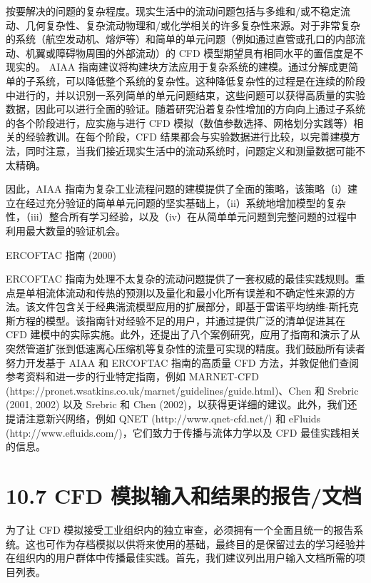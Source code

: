 \documentclass[11pt,a4paper,openany,fontset=none]{ctexbook}
\begin{document}
按要解决的问题的复杂程度。现实生活中的流动问题包括与多维和/或不稳定流动、几何复杂性、复杂流动物理和/或化学相关的许多复杂性来源。对于非常复杂的系统（航空发动机、熔炉等）和简单的单元问题（例如通过直管或孔口的内部流动、机翼或障碍物周围的外部流动）的 CFD 模型期望具有相同水平的置信度是不现实的。 AIAA 指南建议将构建块方法应用于复杂系统的建模。通过分解成更简单的子系统，可以降低整个系统的复杂性。这种降低复杂性的过程是在连续的阶段中进行的，并以识别一系列简单的单元问题结束，这些问题可以获得高质量的实验数据，因此可以进行全面的验证。随着研究沿着复杂性增加的方向向上通过子系统的各个阶段进行，应实施与进行 CFD 模拟（数值参数选择、网格划分实践等）相关的经验教训。在每个阶段，CFD 结果都会与实验数据进行比较，以完善建模方法，同时注意，当我们接近现实生活中的流动系统时，问题定义和测量数据可能不太精确。

因此，AIAA 指南为复杂工业流程问题的建模提供了全面的策略，该策略（i）建立在经过充分验证的简单单元问题的坚实基础上，（ii）系统地增加模型的复杂性，（iii）整合所有学习经验，以及（iv）在从简单单元问题到完整问题的过程中利用最大数量的验证机会。

ERCOFTAC 指南 (2000)

ERCOFTAC 指南为处理不太复杂的流动问题提供了一套权威的最佳实践规则。重点是单相流体流动和传热的预测以及量化和最小化所有误差和不确定性来源的方法。该文件包含关于经典湍流模型应用的扩展部分，即基于雷诺平均纳维-斯托克斯方程的模型。该指南针对经验不足的用户，并通过提供广泛的清单促进其在 CFD 建模中的实际实施。此外，还提出了八个案例研究，应用了指南和演示了从突然管道扩张到低速离心压缩机等复杂性的流量可实现的精度。我们鼓励所有读者努力开发基于 AIAA 和 ERCOFTAC 指南的高质量 CFD 方法，并敦促他们查阅参考资料和进一步的行业特定指南，例如 MARNET-CFD (https://pronet.wsatkins.co.uk/marnet/guidelines/guide.html)、Chen 和 Srebric (2001, 2002) 以及 Srebric 和 Chen (2002)，以获得更详细的建议。此外，我们还提请注意新兴网络，例如 QNET (http://www.qnet-cfd.net/) 和 eFluids (http://www.efluids.com/)，它们致力于传播与流体力学以及 CFD 最佳实践相关的信息。

\section*{10.7 CFD 模拟输入和结果的报告/文档}

为了让 CFD 模拟接受工业组织内的独立审查，必须拥有一个全面且统一的报告系统。这也可作为存档模拟以供将来使用的基础，最终目的是保留过去的学习经验并在组织内的用户群体中传播最佳实践。首先，我们建议列出用户输入文档所需的项目列表。
\end{document}
